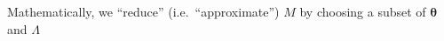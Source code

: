 \documentclass[aspectratio=169]{beamer}
\begin{document}
\begin{frame}

Mathematically, we ``reduce'' (i.e.\ ``approximate'') $M$ by choosing a subset of $\boldsymbol{\theta}$ and $\Lambda$

\bigskip{}


\bigskip{}



\end{frame}
\end{document}
